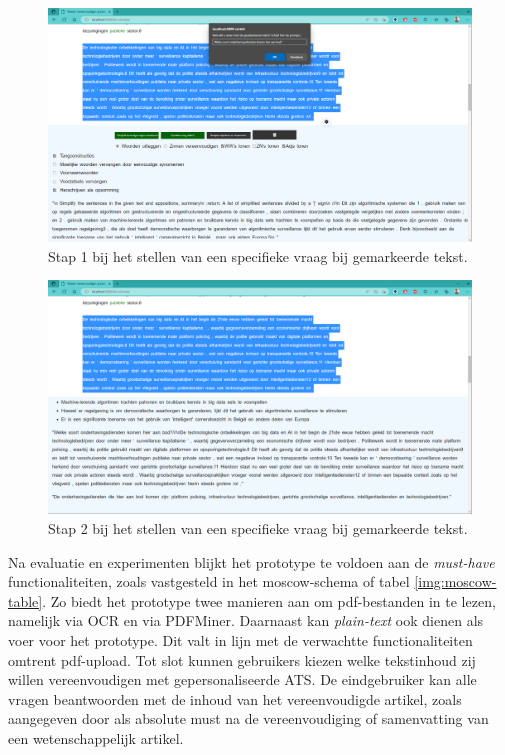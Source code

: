 \begin{center}
	\begin{figure}[H]
		\includegraphics[width=\linewidth]{img/proto-vraagstelling-1.png}
		\caption{Stap 1 bij het stellen van een specifieke vraag bij gemarkeerde tekst.}
		\label{img:step-1-proto-vraagstelling}
	\end{figure}
\end{center}

\begin{center}
	\begin{figure}[H]
		\includegraphics[width=\linewidth]{img/proto-vraagstelling-2.png}
		\caption{Stap 2 bij het stellen van een specifieke vraag bij gemarkeerde tekst.}
		\label{img:step-2-proto-vraagstelling}
	\end{figure}
\end{center}

Na evaluatie en experimenten blijkt het prototype te voldoen aan de \textit{must-have} functionaliteiten, zoals vastgesteld in het moscow-schema of tabel \ref{img:moscow-table}. Zo biedt het prototype twee manieren aan om pdf-bestanden in te lezen, namelijk via OCR en via PDFMiner. Daarnaast kan \textit{plain-text} ook dienen als voer voor het prototype. Dit valt in lijn met de verwachtte functionaliteiten omtrent pdf-upload. Tot slot kunnen gebruikers kiezen welke tekstinhoud zij willen vereenvoudigen met gepersonaliseerde ATS. De eindgebruiker kan alle vragen beantwoorden met de inhoud van het vereenvoudigde artikel, zoals aangegeven door \textcite{Hollenkamp2020} als absolute must na de vereenvoudiging of samenvatting van een wetenschappelijk artikel.

